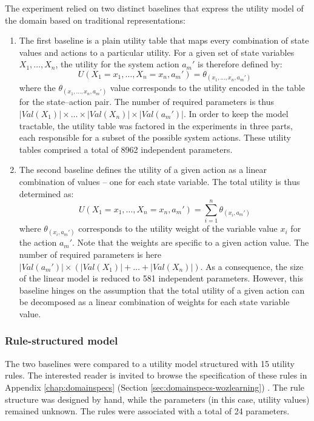 The experiment relied on two distinct baselines that express the utility model of the domain based on traditional representations: \begin{enumerate}
\item The first baseline is a plain utility table that maps every combination of state values and actions to a particular utility.  For a given set of state variables $X_1, \dots, X_n$, 
the utility for the system action $a_m'$ is therefore defined by: 
\begin{equation}
U(X_1=x_1, \dots, X_n=x_n, a_m') = \theta_{(x_1, \dots, x_n, a_m')}
\end{equation}
where the $\theta_{(x_1, \dots, x_n, a_m')}$ value corresponds to the utility encoded in the table for the state--action pair. The number of required parameters is thus $|\mathit{Val}(X_1)| \times \dots \times |\mathit{Val}(X_n)| \times |\mathit{Val}(a_m')|$. In order to keep the model tractable, the utility table was factored in the experiments in three parts, each responsible for a subset of the possible system actions. These utility tables comprised a total of 8962 independent parameters. 
\item The second baseline defines the utility of a given action as a linear combination of values -- one for each state variable.  The total utility is thus determined as:
\begin{equation}
U(X_1=x_1, \dots, X_n=x_n, a_m') = \sum_{i=1}^{n} \theta_{(x_i, a_m')}
\end{equation}
where $\theta_{(x_i, a_m')}$ corresponds to the utility weight of the variable value $x_i$ for the action $a_m'$.  Note that the weights are specific to a given action value. The number of required parameters is here $|\mathit{Val}(a_m')| \times (|\mathit{Val}(X_1)| + \dots + |\mathit{Val}(X_n)|)$.  As a consequence, the size of the linear model is reduced to 581 independent parameters.  However, this baseline hinges on the assumption that the total utility of a given action can be decomposed as a linear combination of weights for each state variable value.
\end{enumerate}

\subsubsection*{Rule-structured model}
The two baselines were compared to a utility model structured with 15 utility rules. The interested reader is invited to browse the specification of these rules in Appendix \ref{chap:domainspecs} (Section \ref{sec:domainspecs-wozlearning}) . The rule structure was designed by hand, while the parameters (in this case, utility values) remained unknown. The rules were associated with a total of 24 parameters. 

